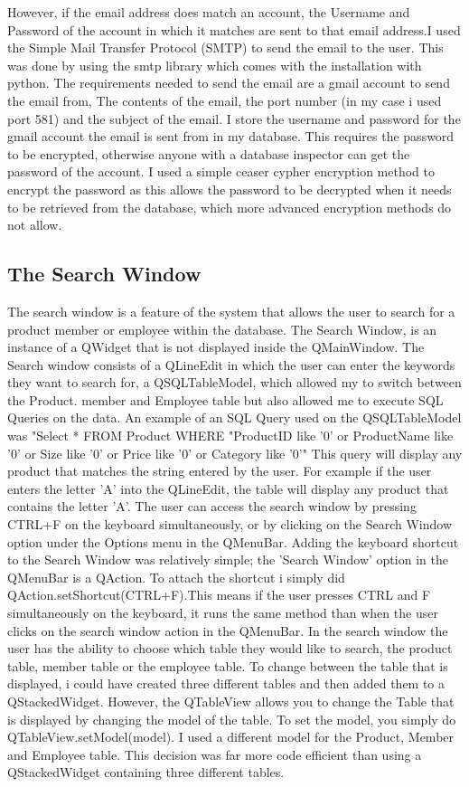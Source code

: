 However, if the email address does match an account, the Username and Password of the account in which it matches are sent to that email address.I used the Simple Mail Transfer Protocol (SMTP) to send the email to the user. This was done by using the smtp library which comes with the installation with python. The requirements needed to send the email are a gmail account to send the email from, The contents of the email, the port number (in my case i used port 581) and the subject of the email. I store the username and password for the gmail account the email is sent from in my database. This requires the password to be encrypted, otherwise anyone with a database inspector can get the password of the account. I used a simple ceaser cypher encryption method to encrypt the password as this allows the password to be decrypted when it needs to be retrieved from the database, which more advanced encryption methods do not allow.


\subsection{The Search Window}

The search window is a feature of the system that allows the user to search for a product member or employee within the database. The Search Window, is an instance of a QWidget that is not displayed inside the QMainWindow. The Search window consists of a QLineEdit in which the user can enter the keywords they want to search for, a QSQLTableModel, which allowed my to switch between the Product. member and Employee table but also allowed me to execute SQL Queries on the data. An example of an  SQL Query used on the QSQLTableModel was "Select * FROM Product WHERE "ProductID like '{0}' or ProductName like '{0}' or Size like '{0}' or Price like '{0}' or Category like '{0}'" This query will display any product that matches the string entered by the user. For example if the user enters the letter 'A' into the QLineEdit, the table will display any product that contains the letter 'A'. The user can access the search window by pressing CTRL+F on the keyboard simultaneously, or by clicking on the Search Window option under the Options menu in the QMenuBar. Adding the keyboard shortcut to the Search Window was relatively simple; the 'Search Window' option in the QMenuBar is a QAction. To attach the shortcut i simply did QAction.setShortcut(CTRL+F).This means if the user presses CTRL and F simultaneously on the keyboard, it runs the same method than when the user clicks on the search window action in the QMenuBar. In the search window the user has the ability to choose which table they would like to search, the product table, member table or the employee table. To change between the table that is displayed, i could have created three different tables and then added them to a QStackedWidget. However, the QTableView allows you to change the Table that is displayed by changing the model of the table. To set the model, you simply do QTableView.setModel(model). I used a different model for the Product, Member and Employee table. This decision was far more code efficient than using a QStackedWidget containing three different tables.

